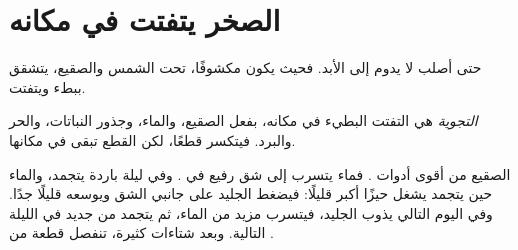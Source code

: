 \section{الصخر يتفتت في مكانه}

حتى أصلب  لا يدوم إلى الأبد. فحيث يكون مكشوفًا، تحت الشمس 
والصقيع، يتشقق ببطء ويتفتت.

\begin{definition}[التجوية]\label{def:g5:water-shapes-the-land:weathering}
\emph{التجوية} هي التفتت البطيء  في مكانه، بفعل الصقيع،
والماء، وجذور النباتات، والحر والبرد. فيتكسر  قطعًا، لكن القطع تبقى في
مكانها.
\end{definition}

الصقيع من أقوى أدوات . فماء  يتسرب إلى شق رفيع في . وفي
ليلة باردة يتجمد، والماء حين يتجمد يشغل حيزًا أكبر قليلًا: فيضغط الجليد على
جانبي الشق ويوسعه قليلًا جدًا. وفي اليوم التالي يذوب الجليد، فيتسرب مزيد من
الماء، ثم يتجمد من جديد في الليلة التالية. وبعد شتاءات كثيرة، تنفصل قطعة من
.


